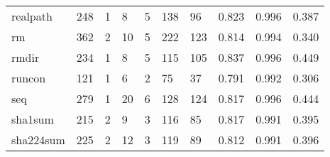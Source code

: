 \begin{longtable}{lp{2.0cm}p{2.0cm}p{2.0cm}p{2.0cm}p{2.0cm}p{2.0cm}p{2.0cm}p{2.0cm}p{2.0cm}}
realpath  &                    248 &                                  1 &                                 8 &                                5 &                               138 &                              96 &                                   0.823 &                                  0.996 &                                0.387 \\
rm        &                    362 &                                  2 &                                10 &                                5 &                               222 &                             123 &                                   0.814 &                                  0.994 &                                0.340 \\
rmdir     &                    234 &                                  1 &                                 8 &                                5 &                               115 &                             105 &                                   0.837 &                                  0.996 &                                0.449 \\
runcon    &                    121 &                                  1 &                                 6 &                                2 &                                75 &                              37 &                                   0.791 &                                  0.992 &                                0.306 \\
seq       &                    279 &                                  1 &                                20 &                                6 &                               128 &                             124 &                                   0.817 &                                  0.996 &                                0.444 \\
sha1sum   &                    215 &                                  2 &                                 9 &                                3 &                               116 &                              85 &                                   0.817 &                                  0.991 &                                0.395 \\
sha224sum &                    225 &                                  2 &                                12 &                                3 &                               119 &                              89 &                                   0.812 &                                  0.991 &                                0.396 \\

\end{longtable}

